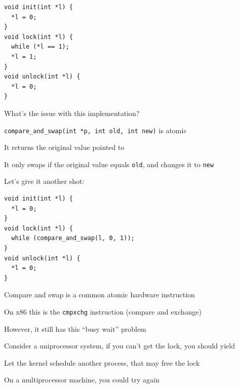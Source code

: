   \begin{slide}


    \begin{verbatim}
void init(int *l) {
  *l = 0;
}
void lock(int *l) {
  while (*l == 1);
  *l = 1;
}
void unlock(int *l) {
  *l = 0;
}   
    \end{verbatim}
    \medskip

    What's the issue with this implementation?



  \end{slide}

  \begin{slide}


    \texttt{compare\_and\_swap(int *p, int old, int new)} is atomic

    \leftspace{}It returns the original value pointed to

    \leftspace{}It only swaps if the original value equals \texttt{old}, and changes it to \texttt{new}
    \medskip

    Let's give it another shot:

    \begin{verbatim}
void init(int *l) {
  *l = 0;
}
void lock(int *l) {
  while (compare_and_swap(l, 0, 1));
}
void unlock(int *l) {
  *l = 0;
}   
    \end{verbatim}

  \end{slide}

  \begin{slide}


    Compare and swap is a common atomic hardware instruction
    \medskip

    On x86 this is the \texttt{cmpxchg} instruction (compare and exchange)
    \medskip

    However, it still has this ``busy wait'' problem
    \medskip

    Consider a uniprocessor system, if you can't get the lock, you should yield

    \leftspace{}Let the kernel schedule another process, that may free the lock
    \medskip

    On a multiprocessor machine, you could try again

  \end{slide}

